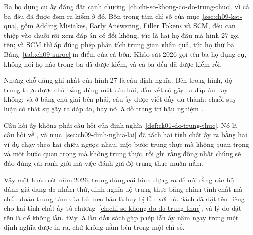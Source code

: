 Ba họ dụng cụ ấy đáng đặt cạnh chương~\ref{ch:chi-so-khong-do-do-trung-thuc}, vì
cả ba đều đã được đem ra kiểm ở đó. Bốn trong tám chỉ số của
mục~\ref{sec:ch09-ket-qua}, gồm Adding Mistakes, Early Answering, Filler Tokens
và SCM, đều can thiệp vào chuỗi rồi xem đáp án có đổi không, tức là hai họ đầu mà
hình 27 gọi tên; và SCM thì áp đúng phép phân tích trung gian nhân quả, tức họ
thứ ba. Bảng~\ref{tab:ch09-auroc} in điểm của cả bốn. Khảo sát 2026 gọi tên ba họ
dụng cụ, không nói họ nào trong ba đã được kiểm, và cả ba đều đã được kiểm rồi.

%
Nhưng chỗ đáng ghi nhất của hình 27 là câu định nghĩa. Bên trong hình, độ trung
thực được chú bằng đúng một câu hỏi, dấu vết có gây ra đáp án hay không; và ở
bảng chú giải bên phải, câu ấy được viết đầy đủ thành: chuỗi suy luận có thật sự
gây ra đáp án, hay nó là đồ trang trí hậu nghiệm~\autocite{p08periodic}.

Câu hỏi ấy không phải câu hỏi của định nghĩa~\ref{def:ch01-do-trung-thuc}. Nó là
câu hỏi về , và
mục~\ref{sec:ch09-dinh-nghia-lai} đã tách hai tính chất ấy ra bằng hai ví dụ
chạy theo hai chiều ngược nhau, một bước trung thực mà không quan trọng và một
bước quan trọng mà không trung thực, rồi ghi rằng đồng nhất chúng sẽ đảo đúng cái
ranh giới mà việc đánh giá độ trung thực muốn nắm.

%
Vậy một khảo sát năm 2026, trong đúng cái hình dựng ra để nói rằng các bộ đánh
giá đang đo nhầm thứ, định nghĩa độ trung thực bằng chính tính chất mà chẩn đoán
trung tâm của bài neo bảo là hay bị lẫn với nó. Sách đã đặt tên riêng cho hai
tính chất ấy từ chương~\ref{ch:chi-so-khong-do-do-trung-thuc}, và lý do đặt tên
là để không lẫn. Đây là lần đầu sách gặp phép lẫn ấy nằm ngay trong một định
nghĩa được in ra, chứ không nằm bên trong một chỉ số.
